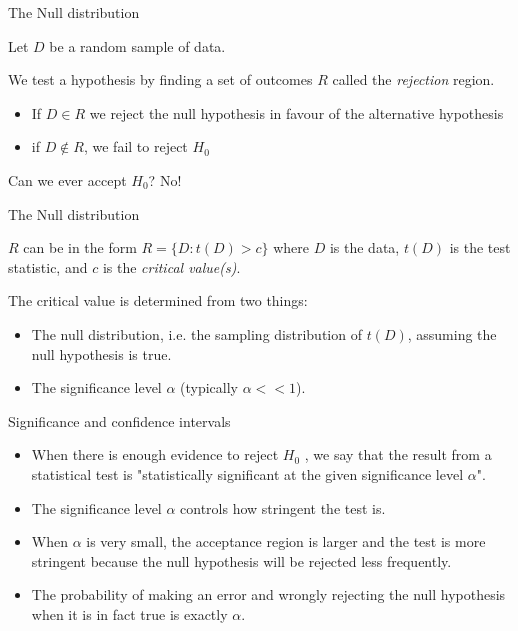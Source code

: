 \documentclass{beamer}
\begin{document}
\begin{frame}{The Null distribution}

	Let $D$ be a random sample of data.

	We test a hypothesis by finding a set of outcomes $R$ called the
	\textit{rejection} region. 

	\begin{itemize}
		\item If $D \in R$ we reject the null hypothesis in favour of the alternative hypothesis
		\item if $D \not\in R$, we fail to reject $H_0$
	\end{itemize}

	Can we ever accept $H_0$? \pause No!

\end{frame}

\begin{frame}{The Null distribution}

	$R$ can be in the form $R=\{D:t(D)>c\}$ where $D$ is the data, $t(D)$ is the test statistic, 
	and $c$ is the \textit{critical value(s)}.

	\vskip 0.5cm
	
	The critical value is determined from two things:
	\begin{itemize}
		\item The null distribution, i.e. the sampling distribution of $t(D)$, assuming the null hypothesis is true.
		\item The significance level $\alpha$ (typically $\alpha <<1$).
	\end{itemize}

\end{frame}

\begin{frame}{Significance and confidence intervals}

	\begin{itemize}
		\item When there is enough evidence to reject $H_0$ , we say that the result
		from a statistical test is "statistically significant at the given
		significance level $\alpha$".
		\item The significance level $\alpha$ controls how stringent the test is. 
		\item When $\alpha$ is very small, the acceptance region is larger and the test is
		more stringent because the null hypothesis will be rejected less frequently.
		\item The probability of making an error and wrongly rejecting the null
		hypothesis when it is in fact true is exactly $\alpha$.
	\end{itemize}

\end{frame}
\end{document}
